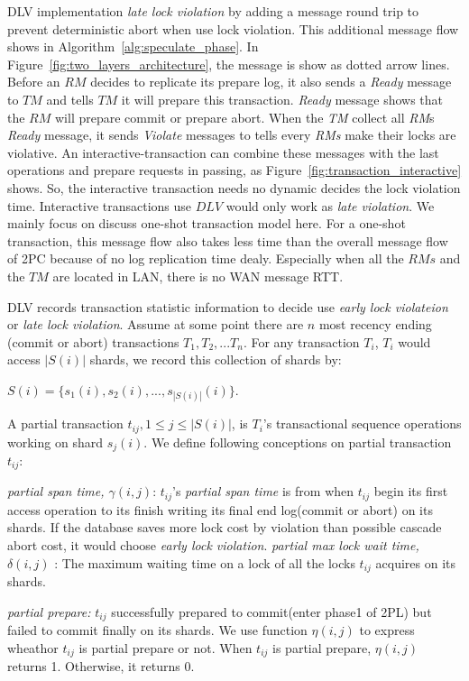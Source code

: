 \documentclass[conference]{IEEEtran}
\begin{document}
DLV implementation \emph{late lock violation} by adding a message round trip to prevent deterministic abort when use lock violation.
This additional message flow shows in Algorithm~\ref{alg:speculate_phase}.
In Figure~\ref{fig:two_layers_architecture}, the message is show as dotted arrow lines.
Before an ${RM}$ decides to replicate its prepare log, it also sends a \emph{Ready} message to ${TM}$ and tells ${TM}$ it will prepare this transaction.
\emph{Ready} message shows that the ${RM}$ will prepare commit or prepare abort.
When the \emph{TM} collect all \emph{RM}s \emph{Ready} message, it sends \emph{Violate} messages to tells every \emph{RMs} make their locks are violative.
An interactive-transaction can combine these messages with the last operations and prepare requests in passing, as Figure~\ref{fig:transaction_interactive} shows.
So, the interactive transaction needs no dynamic decides the lock violation time.
Interactive transactions use ${DLV}$ would only work as \emph{late violation}.
We mainly focus on discuss one-shot transaction model here.
For a one-shot transaction, this message flow also takes less time than the overall message flow of 2PC because of no log replication time dealy.
Especially when all the ${RMs}$ and the ${TM}$ are located in LAN, there is no WAN message RTT.

DLV records transaction statistic information to decide use \emph{early lock violateion} or \emph{late lock violation}.
Assume at some point there are ${n}$ most recency ending (commit or abort) transactions ${T_1, T_2, ... T_n}$.
For any transaction ${T_i}$, ${T_i}$ would access 
${|S(i)|}$ shards, we record this collection of shards by:

${S(i) = \{s_1(i), s_2(i), ..., s_{|S(i)|}(i)\}}$.

A partial transaction ${t_{ij}, 1 \le j \le |S(i)|}$, is ${T_i}$'s transactional sequence operations working on shard ${s_j(i)}$.
We define following conceptions on partial transaction ${t_{ij}}$:

\emph{partial span time, ${\gamma (i, j)}$}:
${t_{ij}}$'s \emph{partial span time} is from when ${t_{ij}}$ begin its first access operation  to its finish writing its final end log(commit or abort) on its shards.
If the database saves more lock cost by violation than possible cascade abort cost, it would choose \emph{early lock violation}.
\emph{partial max lock wait time, ${\delta(i, j)}$ }:
The maximum waiting time on a lock of all the locks ${t_{ij}}$ acquires on its shards.

\emph{partial prepare:}
${t_{ij}}$ successfully prepared to commit(enter phase1 of 2PL) but failed to commit finally on its shards.
We use function ${\eta(i, j)}$ to express wheathor ${t_{ij}}$ is partial prepare or not.
When ${t_{ij}}$ is partial prepare, ${\eta(i, j)}$ returns 1.
Otherwise, it returns 0.
\end{document}
